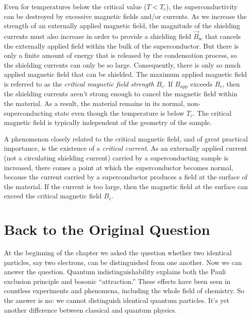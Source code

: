Even for temperatures below the critical value ($T < T_c$), the
superconductivity can be destroyed by excessive magnetic fields and/or
currents.  As we increase the strength of an externally applied
magnetic field, the magnitude of the shielding currents must also
increase in order to provide a shielding field $\vec B_\text{sc}$ that
cancels the externally applied field within the bulk of the
superconductor.  But there is only a finite amount of energy that is
released by the condensation process, so the shielding currents can
only be so large.  Consequently, there is only so much applied
magnetic field that can be shielded.  The maximum applied magnetic
field is referred to as the {\em critical magnetic field strength}
$B_c$.  If $B_\text{app}$ exceeds $B_c$, then the shielding currents aren't
strong enough to cancel the magnetic field within the material.  As a
result, the material remains in its normal, non-superconducting state
even though the temperature is below $T_c$.  The critical magnetic
field is typically independent of the geometry of the sample.


A phenomenon closely related to the critical magnetic field, and of
great practical importance, is the existence of a {\em critical
current}.  As an externally applied current (not a circulating
shielding current) carried by a superconducting sample is increased,
there comes a point at which the superconductor becomes normal, because
the current carried by a superconductor produces a field
at the surface of the material.  If the current is too large, then the
magnetic field at the surface can exceed the critical magnetic field
$B_c$.


\section{Back to the Original Question}

At the beginning of the chapter we asked the question whether two
identical particles, say two electrons, can be distinguished from one
another.  Now we can answer the question.  Quantum indistinguishability
explains both the Pauli exclusion principle and bosonic ``attraction.''
These effects have been seen in countless experiments and phenomena,
including the whole field of chemistry.  So the answer is no: we
cannot distinguish identical quantum particles.  It's yet another
difference between classical and quantum physics.

